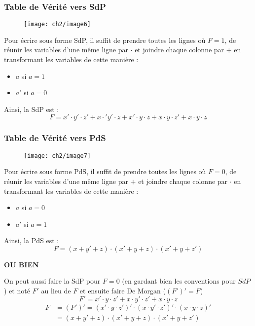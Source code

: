 \subsubsection{Table de Vérité vers SdP}
\label{subsubsec : TdV->SdP}
\begin{figure}[H]
	\centering
	\texttt{[image: ch2/image6]}
\end{figure}
Pour écrire sous forme SdP, il suffit de prendre toutes les lignes où $F=1$, de réunir les variables d'une même ligne par $\cdot$ et joindre chaque colonne par $+$ en transformant les variables de cette manière :
\begin{itemize}
	\item $a$ si $a=1$
	\item $a'$ si $a=0$
\end{itemize}
Ainsi, la SdP est :
\begin{equation}
	F=x'\cdot y'\cdot z'+x\cdot' y'\cdot z+x'\cdot y\cdot z+x\cdot y\cdot z'+x\cdot y\cdot z
\end{equation}
\subsubsection{Table de Vérité vers PdS}
\label{subsubsec : TdV->PdS}
\begin{figure}[H]
	\centering
	\texttt{[image: ch2/image7]}
\end{figure}
Pour écrire sous forme PdS, il suffit de prendre toutes les lignes où $F=0$, de réunir les variables d'une même ligne par $+$ et joindre chaque colonne par $\cdot$ en transformant les variables de cette manière :
\begin{itemize}
	\item $a$ si $a=0$
	\item $a'$ si $a=1$
\end{itemize}
Ainsi, la PdS est :
\begin{equation}
F=(x+y'+z)\cdot(x'+y+z)\cdot(x'+y+z')
\end{equation}
\begin{center}
	\textbf{OU BIEN}
\end{center}
On peut aussi faire la SdP pour $F=0$ (en gardant bien les conventions pour $SdP$) et noté $F'$ au lieu de $F$ et ensuite faire De Morgan ($(F')'=F$)
\begin{equation}
F'= x'\cdot y\cdot z'+x\cdot y'\cdot z'+x\cdot y\cdot z
\end{equation}
\begin{align}
	F &=(F')'=(x'\cdot y\cdot z')'\cdot(x\cdot y'\cdot z')'\cdot(x\cdot y\cdot z)'\\
	&= (x+y'+z)\cdot(x'+y+z)\cdot(x'+y+z')
\end{align}
